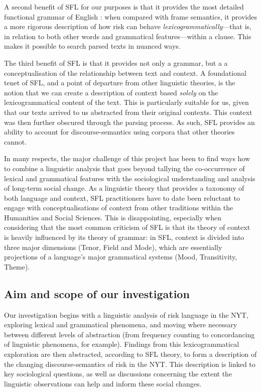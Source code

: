 \documentclass{report}
\begin{document}
A second benefit of SFL for our purposes is that it provides the most detailed functional grammar of English \cite{eggins_analysing_2004}: when compared with frame semantics, it provides a more rigorous description of how risk can behave \emph{lexicogrammatically}---that is, in relation to both other words and grammatical features---within a clause. This makes it possible to search parsed texts in nuanced ways.

The third benefit of SFL is that it provides not only a grammar, but a a conceptualisation of the relationship between text and context. A foundational tenet of SFL, and a point of departure from other linguistic theories, is the notion that we can create a description of context based \emph{solely} on the lexicogrammatical content of the text. This is particularly suitable for us, given that our texts arrived to us abstracted from their original contexts. This context was then further obscured through the parsing process. As such, SFL provides an ability to account for discourse-semantics using corpora that other theories cannot.

In many respects, the major challenge of this project has been to find ways how to combine a linguistic analysis that goes beyond tallying the co-occurrence of lexical and grammatical features with the sociological understanding and analysis of long-term social change. As a linguistic theory that provides a taxonomy of both language and context, SFL practitioners have to date been reluctant to engage with conceptualisations of context from other traditions within the Humanities and Social Sciences. This is disappointing, especially when considering that the most common criticism of SFL is that its theory of context is heavily influenced by its theory of grammar: in SFL, context is divided into three major dimensions (Tenor, Field and Mode), which are essentially projections of a language's major grammatical systems (Mood, Transitivity, Theme).


\subsection{Aim and scope of our investigation}

Our investigation begins with a linguistic analysis of risk language in the NYT, exploring lexical and grammatical phenomena, and moving where necessary between different levels of abstraction (from frequency counting to concordancing of linguistic phenomena, for example). Findings from this lexicogrammatical exploration are then abstracted, according to SFL theory, to form a description of the changing discourse-semantics of risk in the NYT. This description is linked to key sociological questions, as well as discussions concerning the extent the linguistic observations can help and inform these social changes. 
\end{document}
